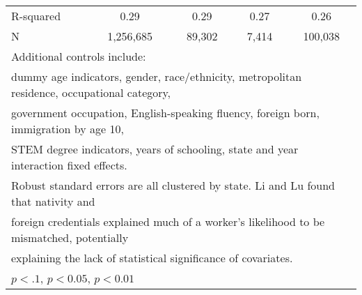 \begin{table}[htbp]
\begin{tabular}{l*{4}{c}}
R-squared           &        0.29         &        0.29         &        0.27         &        0.26         \\
N                   &   1,256,685         &      89,302         &       7,414         &     100,038         \\
\bottomrule
\multicolumn{5}{l}{\footnotesize Additional controls include:}\\
\multicolumn{5}{l}{\footnotesize dummy age indicators, gender, race/ethnicity, metropolitan residence, occupational category,}\\
\multicolumn{5}{l}{\footnotesize government occupation, English-speaking fluency, foreign born, immigration by age 10,}\\
\multicolumn{5}{l}{\footnotesize STEM degree indicators, years of schooling, state and year interaction fixed effects.}\\
\multicolumn{5}{l}{\footnotesize Robust standard errors are all clustered by state. Li and Lu found that nativity and}\\
\multicolumn{5}{l}{\footnotesize foreign credentials explained much of a worker's likelihood to be mismatched, potentially}\\
\multicolumn{5}{l}{\footnotesize explaining the lack of statistical significance of covariates.}\\
\multicolumn{5}{l}{\footnotesize \sym{*} \(p<.1\), \sym{**} \(p<0.05\), \sym{***} \(p<0.01\)}\\
\end{tabular}
\end{table}
